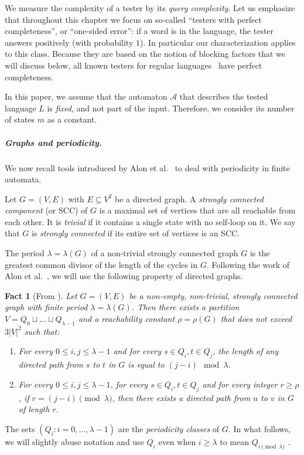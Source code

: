 \documentclass[letterpaper, USenglish, cleveref, autoref, thm-restate, numberwithinsect]{lipics-v2021}
\theoremstyle{theorem}
\newtheorem{fact}[theorem]{Fact}
\theoremstyle{definition}
\newcommand{\Aa}{\mathcal{A}}
\newcommand{\doc}{chapter\xspace}
\newcommand{\doc}{article\xspace}
\begin{document}
We measure the complexity of a tester by its \emph{query complexity}.
Let us emphasize that throughout this \doc we focus on so-called ``testers with perfect completeness'', or ``one-sided error'': if a word is in the language, the tester answers positively (with probability $1$). In particular our characterization applies to this class. 
Because they are based on the notion of blocking factors that we will discuss below, all known testers for regular languages~\cite{alon2001regular,magniez2007property,francois_et_al:LIPIcs:2016:6355, bathie2021property} have perfect completeness.

In this paper, we assume that the automaton $\Aa$ that describes the tested language $L$ is \emph{fixed}, and not part of the input. Therefore, we consider its number of states $m$ as a constant.

\subparagraph*{Graphs and periodicity.}
We now recall tools introduced by Alon et al.~\cite{alon2001regular} to deal with periodicity in finite automata.

Let $G = (V,E)$ with $E \subseteq V^2$ be a directed graph.
A \emph{strongly connected component} (or SCC) of $G$ is a maximal set of vertices that are all reachable from each other. 
It is \emph{trivial} if it contains a single state with no self-loop on it. 
We say that $G$ is \emph{strongly connected} if its entire set of vertices is an SCC.

 
The period $\lambda = \lambda(G)$ of a non-trivial strongly connected graph $G$ is the greatest common divisor of the length of the cycles in $G$.
Following the work of Alon et al.~\cite{alon2001regular}, we will use the following property of directed graphs.
\begin{fact}[{From \cite[Lemma 2.3]{alon2001regular}}]\label{fact:periodicity}
    Let $G = (V,E)$ be a non-empty, non-trivial, strongly connected graph with finite period $\lambda = \lambda(G)$.
    Then there exists a partition $V = Q_0\sqcup \ldots \sqcup Q_{\lambda-1}$ and a reachability constant $\rho = \rho(G)$ that does not exceed $3|V|^2$ such that:
    \begin{enumerate}
        \item\label{case:path-length} For every $0 \le i,j\le \lambda-1$ and for every $s\in Q_i, t\in Q_j$, the length of any directed path from $s$ to $t$ in $G$ is equal to $(j-i)\mod \lambda$.
        \item For every $0 \le i,j\le \lambda-1$, for every $s\in Q_i, t\in Q_j$ and for every integer $r\ge \rho$, if $r = (j-i) \pmod{\lambda}$, then  there exists a directed path from $u$ to $v$ in $G$ of length $r$.
    \end{enumerate}
\end{fact}
The sets $(Q_i: i = 0,\ldots, \lambda-1)$ are the \emph{periodicity classes} of $G$. In what follows, we will slightly abuse notation and use $Q_i$ even when $i \ge \lambda$ to mean $Q_{i \pmod{\lambda}}$ .
\end{document}
